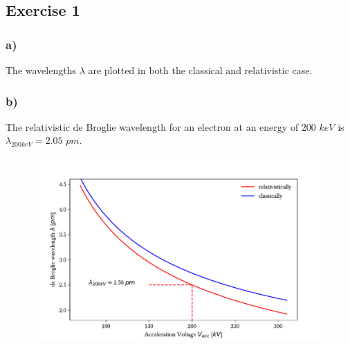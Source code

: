 \documentclass[a4paper]{scrartcl}
\begin{document}
\subsection*{Exercise 1}
\subsubsection*{a)}
The wavelengths $\lambda$ are plotted in both the classical and relativistic case.
\subsubsection*{b)}
The relativistic de Broglie wavelength for an electron at an energy of $200$ $keV$ is $\lambda_{200keV}=2.05$ $pm$.

\begin{figure}
  \centering
  \includegraphics[width=\linewidth,keepaspectratio]{problem1.pdf}
\end{figure}

\newpage
\end{document}
